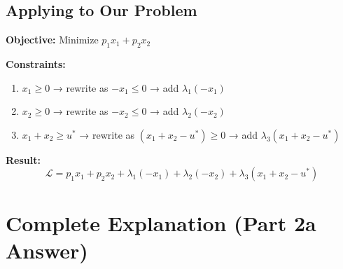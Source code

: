 \documentclass[11pt]{article}
\begin{document}
\subsection{Applying to Our Problem}

\textbf{Objective:} Minimize $p_1 x_1 + p_2 x_2$

\textbf{Constraints:}
\begin{enumerate}
\item $x_1 \geq 0$ → rewrite as $-x_1 \leq 0$ → add $\lambda_1(-x_1)$
\item $x_2 \geq 0$ → rewrite as $-x_2 \leq 0$ → add $\lambda_2(-x_2)$
\item $x_1 + x_2 \geq u^*$ → rewrite as $(x_1 + x_2 - u^*) \geq 0$ → add $\lambda_3(x_1 + x_2 - u^*)$
\end{enumerate}

\textbf{Result:}
$$\mathcal{L} = p_1 x_1 + p_2 x_2 + \lambda_1(-x_1) + \lambda_2(-x_2) + \lambda_3(x_1 + x_2 - u^*)$$

\section{Complete Explanation (Part 2a Answer)}
\end{document}
